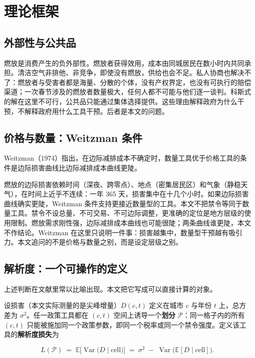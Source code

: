 \section{理论框架}\label{sec:theory}

\subsection{外部性与公共品}

燃放是消费产生的负外部性。燃放者获得效用，成本由同城居民在数小时内共同承担。清洁空气非排他、非竞争，即使没有燃放，供给也会不足。私人协商也解决不了：燃放者与受害者都是海量、分散的个体，没有产权界定，也没有可执行的赔偿渠道；一次春节涉及的燃放者数量极大，任何人都不可能与他们逐一谈判。科斯式的解在这里不可行，公共品只能通过集体选择提供。这些理由解释政府为什么干预，不解释政府用什么工具干预。后者是本文的问题。

\subsection{价格与数量：Weitzman 条件}

Weitzman（1974）指出，在边际减排成本不确定时，数量工具优于价格工具的条件是边际损害曲线比边际减排成本曲线更陡。

燃放的边际损害依赖时间（深夜、跨零点）、地点（密集居民区）和气象（静稳天气），在时间上近乎不连续：一年 365 天，损害集中在十几个小时。如果边际损害曲线确实更陡，Weitzman 条件支持更接近数量型的工具。本文不把禁令等同于数量工具。禁令不设总量、不可交易、不可边际调整，更准确的定位是地方层级的使用限制。燃放需求刚性强，边际减排成本曲线也可能很陡；两条曲线谁更陡，本文不作结论。Weitzman 在这里只说明一件事：损害越集中，数量型干预越有吸引力。本文追问的不是价格与数量之别，而是设定层级之别。

\subsection{解析度：一个可操作的定义}\label{sec:resolution}

上述判断在文献里常以比喻出现。本文把它写成可以直接计算的对象。

设损害（本文实际测量的是尖峰增量）$D(c,t)$ 定义在城市 $c$ 与年份 $t$ 上，总方差为 $\sigma^2$。任一政策工具都在 $(c,t)$ 空间上诱导一个\textbf{划分} $\mathcal{P}$：同一格子内的所有 $(c,t)$ 只能被施加同一个政策参数，即同一个税率或同一个禁令强度。定义该工具的\textbf{解析度损失}为

\begin{equation}
L(\mathcal{P}) \;=\; \mathbb{E}\big[\operatorname{Var}\big(D \mid \text{cell}\big)\big]
\;=\; \sigma^2 \;-\; \operatorname{Var}\big(\mathbb{E}[D \mid \text{cell}]\big).
\label{eq:loss}
\end{equation}

